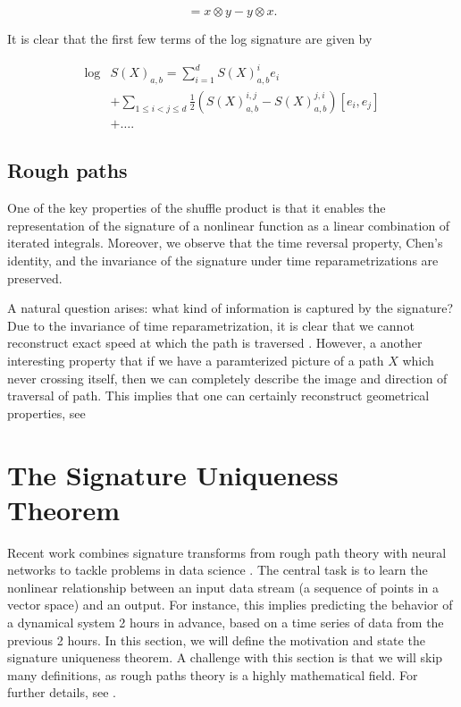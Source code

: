 \begin{equation}
[x, y] = x \otimes y - y \otimes x. \tag{1.55}
\end{equation}

It is clear that the first few terms of the log signature are given by

\begin{equation}
    \begin{split}
\log&  S(X)_{a,b}  = \sum_{i=1}^{d} S(X)^i_{a,b} e_i \\  &+ \sum_{1 \leq i < j \leq d} \frac{1}{2} \left( S(X)^{i,j}_{a,b}  - S(X)^{j,i}_{a,b} \right) [e_i, e_j] \\ &  + \dots .
    \end{split}
\end{equation}


\subsection{Rough paths}%
\label{sub:rough_paths}


One of the key properties of the shuffle product is that it enables the representation of the signature of a nonlinear function as a linear combination of iterated integrals. Moreover, we observe that the time reversal property, Chen's identity, and the invariance of the signature under time reparametrizations are preserved.

A natural question arises: what kind of information is captured by the signature?
Due to the invariance of time reparametrization, it is clear that we cannot reconstruct exact speed at which the path is traversed \cite{chevyrev2016primer}.
However, a another interesting property that if we have a paramterized picture of a path $X$ which never crossing itself, then we can completely describe the image and direction of traversal of path. This implies that one can certainly
reconstruct geometrical properties, see \cite{lyons2017hyperbolic, chang2019insertion, geng2017reconstruction}




\section{The Signature Uniqueness Theorem}

Recent work combines signature transforms from rough path theory with neural networks to tackle problems in data science \cite{fermanian2023new, cass2024lecture}. The central task is to learn the nonlinear relationship between an input data stream (a sequence of points in a vector space)
and an output.
For instance, this implies predicting the behavior of a dynamical system 2 hours in advance, based on a time series of data from the previous 2 hours.
In this section, we will define the motivation and state the signature uniqueness theorem. A challenge with this section is that we will skip many definitions, as rough paths theory is a highly mathematical field. For further details, see \cite{boedihardjo2016signature}.

